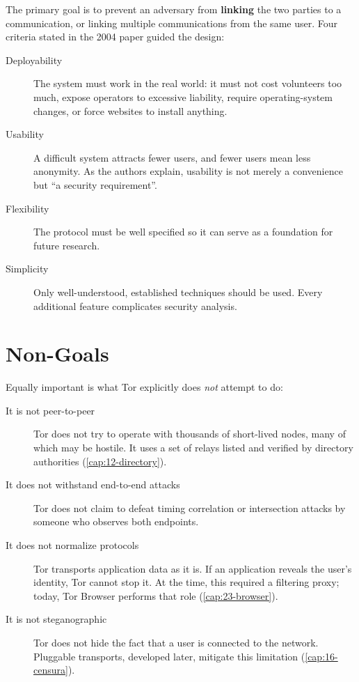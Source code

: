 The primary goal is to prevent an adversary from \textbf{linking} the two parties to a communication, or linking multiple communications from the same user. Four criteria stated in the 2004 paper guided the design:
\begin{description}
  \item[Deployability] The system must work in the real world: it must not cost volunteers too much, expose operators to excessive liability, require operating-system changes, or force websites to install anything.
  \item[Usability] A difficult system attracts fewer users, and fewer users mean less anonymity. As the authors explain, usability is not merely a convenience but \enquote{a security requirement}.
  \item[Flexibility] The protocol must be well specified so it can serve as a foundation for future research.
  \item[Simplicity] Only well-understood, established techniques should be used. Every additional feature complicates security analysis.
\end{description}

\section{Non-Goals}\label{sec:minaccia-nonobiettivi}

Equally important is what Tor explicitly does \emph{not} attempt to do:
\begin{description}
  \item[It is not peer-to-peer] Tor does not try to operate with thousands of short-lived nodes, many of which may be hostile. It uses a set of relays listed and verified by directory authorities (\cref{cap:12-directory}).
  \item[It does not withstand end-to-end attacks] Tor does not claim to defeat timing correlation or intersection attacks by someone who observes both endpoints.
  \item[It does not normalize protocols] Tor transports application data as it is. If an application reveals the user's identity, Tor cannot stop it. At the time, this required a filtering proxy; today, Tor Browser performs that role (\cref{cap:23-browser}).
  \item[It is not steganographic] Tor does not hide the fact that a user is connected to the network. Pluggable transports, developed later, mitigate this limitation (\cref{cap:16-censura}).
\end{description}

